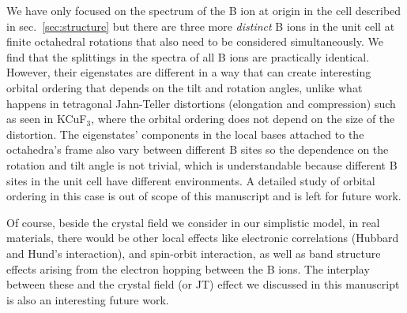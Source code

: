\documentclass[a4paper,prb,twocolumn]{revtex4-1}  %
\newcommand{\com}[1]{}
\begin{document}
\com{
Based on our analysis of A and B cages,
we expect that,
in case of atomic scale perovskite superlattices
with cations having different charges in alternating layers,
the crystal field at B sites will bear the exact same deformation as in case of 
a tetragonal distortion of the octahedra,
and should lead to 
a JT like splitting even 
in the symmetric structure, i.e., with no structural distortion.
Considering the charge as a dynamic variable,
it should then also be possible that in 
simple perovskites structure,
the system might encounter charge instabilities similar to the structural ones,
where the system is stabilised by a charge transfer from one site to another
that lowers the electronic energy and costs 
the ``elastic'' energy proportional to the chemical hardness of the ions involved.
Such considerations might be useful in studying polaron formation and dynamics.
}



We have only focused on the spectrum of the B ion at 
origin
 in the cell 
described in sec.~\ref{sec:structure}
but 
there are three more \emph{distinct} B ions in the unit cell 
at finite octahedral rotations that also 
need to be considered simultaneously.
We find that the splittings in the spectra
of all B ions are
practically identical.
However, their eigenstates 
are different in a way that can
create interesting orbital ordering
that depends on the tilt and rotation angles,
unlike what happens in 
tetragonal Jahn-Teller distortions (elongation and compression) 
such as seen in KCuF$_3$, 
where the orbital ordering does not depend on the size of the distortion.
The eigenstates' components in the local bases attached to the octahedra's frame
also vary between different B sites 
so the dependence on the rotation and tilt angle is not trivial,
which is understandable because different B sites in the unit cell have different environments. 
A detailed study of orbital ordering in this case is out of scope of this manuscript and is left for future work.


Of course, beside the crystal field we consider in our simplistic model,
in real materials,
 there would be other local effects like
electronic correlations (Hubbard and Hund's interaction), 
and spin-orbit interaction, 
as well as band structure effects arising from
the electron hopping between the B ions.
The interplay between these and the crystal field (or JT) effect 
we discussed in this manuscript is also an interesting future work.
\end{document}
